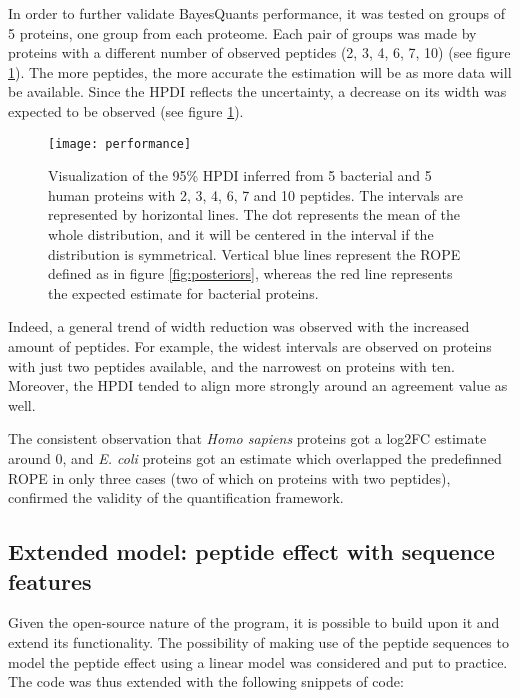In order to further validate BayesQuant\textquotesingle s performance, it was tested on groups of 5 proteins, one group from each proteome. Each pair of groups was made by proteins with a different number of observed peptides (2, 3, 4, 6, 7, 10) (see figure \ref{fig:dumbbell}). The more peptides, the more accurate the estimation will be as more data will be available. Since the \ac{HPDI} reflects the uncertainty, a decrease on its width was expected to be observed (see figure \ref{fig:dumbbell}).

\begin{figure}[!h]
\centering
\texttt{[image: performance]}
\caption[HPDI inferred by BayesQuant]{Visualization of the 95\% \ac{HPDI} inferred from 5 bacterial and 5 human proteins with 2, 3, 4, 6, 7 and 10 peptides. The intervals are represented by horizontal lines. The dot represents the mean of the whole distribution, and it will be centered in the interval if the distribution is symmetrical. Vertical blue lines represent the ROPE defined as in figure \ref{fig:posteriors}, whereas the red line represents the expected estimate for bacterial proteins.}
\label{fig:dumbbell}
\end{figure}


Indeed, a general trend of width reduction was observed with the increased amount of peptides. For example, the widest intervals are observed on proteins with just two peptides available, and the narrowest on proteins with ten. Moreover, the \ac{HPDI} tended to align more strongly around an agreement value as well. 

The consistent observation that \textit{Homo sapiens} proteins got a \ac{log2FC} estimate around 0, and \textit{E. coli} proteins got an estimate which overlapped the predefinned \ac{ROPE} in only three cases (two of which on proteins with two peptides), confirmed the validity of the quantification framework.

\subsection{Extended model: peptide effect with sequence features}
\label{subsec:extended_model}

Given the open-source nature of the program, it is possible to build upon it and extend its functionality. The possibility of making use of the peptide sequences to model the peptide effect using a linear model was considered and put to practice. The code was thus extended with the following snippets of code:


